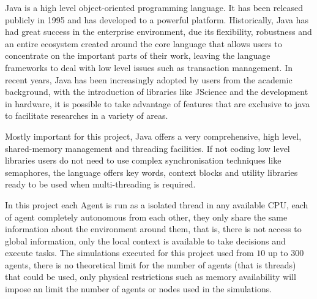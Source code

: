 Java is a high level object-oriented programming language. It has been released publicly in 1995 and has developed to a powerful platform. Historically, Java has had great success in the enterprise environment, due its flexibility, robustness and an entire ecosystem created around the core language that allows users to concentrate on the important parts of their work, leaving the language frameworks to deal with low level issues such as transaction management. In recent years, Java has been increasingly adopted by users from the academic background, with the introduction of libraries like JScience and the development in hardware, it is possible to take advantage of features that are exclusive to java to facilitate researches in a variety of areas.

Mostly important for this project, Java offers a very comprehensive, high level, shared-memory management and threading facilities. If not coding low level libraries users do not need to use complex synchronisation techniques like semaphores, the language offers key words, context blocks and utility libraries ready to be used when multi-threading is required.

In this project each Agent is run as a isolated thread in any available CPU, each of agent completely autonomous from each other, they only share the same information about the environment around them, that is, there is not access to global information, only the local context is available to take decisions and execute tasks. The simulations executed for this project used from $10$ up to $300$ agents, there is no theoretical limit for the number of agents (that is threads) that could be used, only physical restrictions such as memory availability will impose an limit the number of agents or nodes used in the simulations.